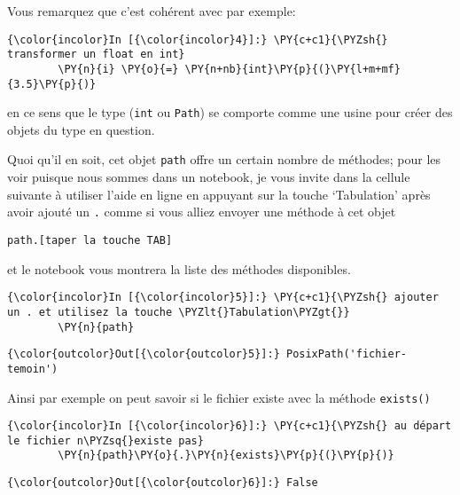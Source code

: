     Vous remarquez que c'est cohérent avec par exemple:

    \begin{Verbatim}[commandchars=\\\{\}]
{\color{incolor}In [{\color{incolor}4}]:} \PY{c+c1}{\PYZsh{} transformer un float en int}
        \PY{n}{i} \PY{o}{=} \PY{n+nb}{int}\PY{p}{(}\PY{l+m+mf}{3.5}\PY{p}{)}
\end{Verbatim}


    en ce sens que le type (\texttt{int} ou \texttt{Path}) se comporte comme
une usine pour créer des objets du type en question.

    Quoi qu'il en soit, cet objet \texttt{path} offre un certain nombre de
méthodes; pour les voir puisque nous sommes dans un notebook, je vous
invite dans la cellule suivante à utiliser l'aide en ligne en appuyant
sur la touche `Tabulation' après avoir ajouté un \texttt{.} comme si
vous alliez envoyer une méthode à cet objet

\begin{verbatim}
path.[taper la touche TAB]
\end{verbatim}

et le notebook vous montrera la liste des méthodes disponibles.

    \begin{Verbatim}[commandchars=\\\{\}]
{\color{incolor}In [{\color{incolor}5}]:} \PY{c+c1}{\PYZsh{} ajouter un . et utilisez la touche \PYZlt{}Tabulation\PYZgt{}}
        \PY{n}{path}
\end{Verbatim}


\begin{Verbatim}[commandchars=\\\{\}]
{\color{outcolor}Out[{\color{outcolor}5}]:} PosixPath('fichier-temoin')
\end{Verbatim}
            
    Ainsi par exemple on peut savoir si le fichier existe avec la méthode
\texttt{exists()}

    \begin{Verbatim}[commandchars=\\\{\}]
{\color{incolor}In [{\color{incolor}6}]:} \PY{c+c1}{\PYZsh{} au départ le fichier n\PYZsq{}existe pas}
        \PY{n}{path}\PY{o}{.}\PY{n}{exists}\PY{p}{(}\PY{p}{)}
\end{Verbatim}


\begin{Verbatim}[commandchars=\\\{\}]
{\color{outcolor}Out[{\color{outcolor}6}]:} False
\end{Verbatim}
            
